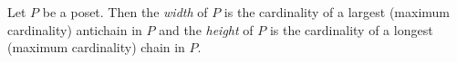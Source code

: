 \documentclass[12pt]{article}
\begin{document}
Let $P$ be a poset. Then the \emph{width} of $P$ is the cardinality of a largest (maximum cardinality) antichain in $P$ and the \emph{height} of $P$ is the cardinality of a longest (maximum cardinality) chain in $P$.
\end{document}
